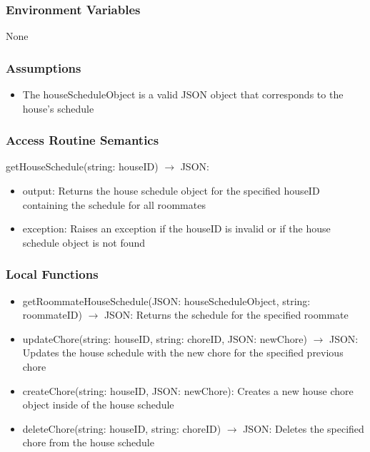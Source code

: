 \documentclass[12pt, titlepage]{article}
\begin{document}
\subsubsection{Environment Variables}
None

\subsubsection{Assumptions}

\begin{itemize}
  \item The houseScheduleObject is a valid JSON object that corresponds to the house's schedule
\end{itemize}

\subsubsection{Access Routine Semantics}

\noindent getHouseSchedule(string: houseID) $\rightarrow$ JSON:
\begin{itemize}
\item output: Returns the house schedule object for the specified houseID containing the schedule for all roommates
\item exception: Raises an exception if the houseID is invalid or if the house schedule object is not found
\end{itemize}


\subsubsection{Local Functions}

\begin{itemize}
  \item getRoommateHouseSchedule(JSON: houseScheduleObject, string: roommateID) $\rightarrow$ JSON: Returns the schedule for the specified roommate
  \item updateChore(string: houseID, string: choreID, JSON: newChore) $\rightarrow$ JSON: Updates the house schedule with the new chore for the specified previous chore
  \item createChore(string: houseID, JSON: newChore): Creates a new house chore object inside of the house schedule
  \item deleteChore(string: houseID, string: choreID) $\rightarrow$ JSON: Deletes the specified chore from the house schedule

\end{itemize}
\end{document}
